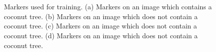 \documentclass[a4paper,conference]{IEEEtran}
\begin{document}
\begin{figure}[!t]
    \centering
    ~
    \\
    ~
    \caption{Markers used for training. (a) Markers on an image which contains a coconut tree. (b) Markers on an image which does not contain a coconut tree. (c) Markers on an image which does not contain a coconut tree. (d) Markers on an image which does not contain a coconut tree.}
    \label{fig:markers}
\end{figure}
\end{document}
